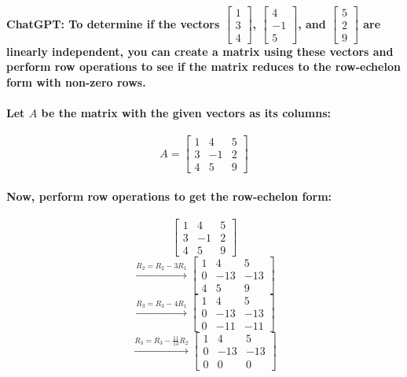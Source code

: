 \documentclass[11pt]{article} %
\begin{document}
\begin{mdframed}[
        backgroundcolor=white,  %
        linecolor=black,        %
        leftmargin=5pt,         %
        rightmargin=5pt,        %
        linewidth=2pt           %
    ]
    \paragraph{\textbf{ChatGPT}: To determine if the vectors \( \begin{bmatrix} 1 \\ 3 \\ 4 \end{bmatrix} \), \( \begin{bmatrix} 4 \\ -1 \\ 5 \end{bmatrix} \), and \( \begin{bmatrix} 5 \\ 2 \\ 9 \end{bmatrix} \) are linearly independent, you can create a matrix using these vectors and perform row operations to see if the matrix reduces to the row-echelon form with non-zero rows.}
    \paragraph{Let \( A \) be the matrix with the given vectors as its columns:}
    \[ A = \begin{bmatrix} 1 & 4 & 5 \\ 3 & -1 & 2 \\ 4 & 5 & 9 \end{bmatrix} \]
    \paragraph{Now, perform row operations to get the row-echelon form:}
    \[ \begin{bmatrix} 1 & 4 & 5 \\ 3 & -1 & 2 \\ 4 & 5 & 9 \end{bmatrix} \]
    \[ \overset{R_2 = R_2 - 3R_1}{\longrightarrow} \begin{bmatrix} 1 & 4 & 5 \\ 0 & -13 & -13 \\ 4 & 5 & 9 \end{bmatrix} \]
    \[ \overset{R_3 = R_3 - 4R_1}{\longrightarrow} \begin{bmatrix} 1 & 4 & 5 \\ 0 & -13 & -13 \\ 0 & -11 & -11 \end{bmatrix} \]
    \[ \overset{R_3 = R_3 - \frac{11}{13}R_2}{\longrightarrow} \begin{bmatrix} 1 & 4 & 5 \\ 0 & -13 & -13 \\ 0 & 0 & 0 \end{bmatrix} \]

\end{mdframed}
\end{document}
